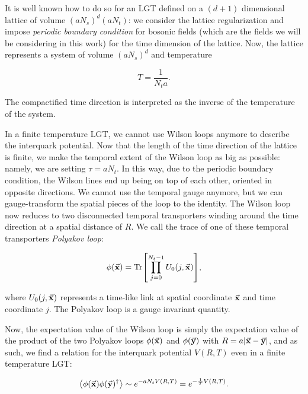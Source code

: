 \documentclass[reqno,12pt]{article}
\numberwithin{equation}{section}
\begin{document}
It is well known how to do so for an LGT defined on a $(d+1)$ dimensional lattice of volume $(aN_s)^d(aN_t)$:
we consider the lattice regularization and impose \textit{periodic boundary condition} 
for bosonic fields (which are the fields we will be considering in this work) for the time dimension of the lattice. 
Now, the lattice represents a system of volume $(aN_s)^d$ and temperature

\begin{equation} \label{eq:lattice_temperature}
	T = \frac{1}{N_t a}.
\end{equation}

The compactified time direction is interpreted as the inverse of the temperature of the system.

In a finite temperature LGT, we cannot use Wilson loops anymore to describe the interquark potential. Now that the 
length of the time direction of the lattice is finite, we make the temporal extent of the Wilson loop as big as possible:
namely, we are setting $\tau = aN_t$. In this way, due to the periodic boundary condition,
the Wilson lines end up being on top of each other, oriented in opposite directions. We cannot use the temporal gauge
anymore, but we can gauge-transform the spatial pieces of the loop to the identity. The Wilson loop now reduces to two 
disconnected temporal transporters winding around the time direction at a spatial distance of $R$. We call the trace of one
of these temporal transporters \textit{Polyakov loop}:

\begin{equation} \label{eq:polyloop_definition}
	\phi(\va{x}) = \Tr[\prod_{j = 0}^{N_t - 1} U_0(j, \va{x})],
\end{equation}

where $U_0(j, \va{x})$ represents a time-like link at spatial coordinate $\va{x}$ and time coordinate $j$. The Polyakov
loop is a gauge invariant quantity.

Now, the expectation value of the Wilson loop is simply the expectation value of the product of the two Polyakov loops
$\phi(\va{x})$ and $\phi(\va{y})$ with $R = a |\va{x} - \va{y}|$, and as such, we find a relation for the interquark potential
$V(R, T)$ even in a finite temperature LGT:

\begin{equation} \label{eq:polyloop_correlator}
	\expval{\phi(\va{x}) \phi(\va{y})^\dagger} \sim e^{-aN_t V(R, T)} = e^{-\frac{1}{T} V(R, T)}.
\end{equation}
\end{document}
